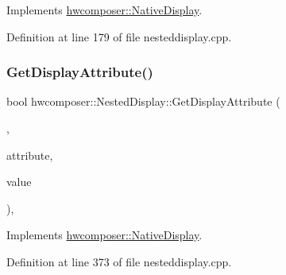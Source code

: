 Implements \mbox{\hyperlink{classhwcomposer_1_1NativeDisplay_a9d4d9d2f6633fe37025210cac6e8cc6c}{hwcomposer\+::\+Native\+Display}}.



Definition at line 179 of file nesteddisplay.\+cpp.


\begin{DoxyCode}{0}
\end{DoxyCode}
\mbox{\label{classhwcomposer_1_1NestedDisplay_aa63c8ca48c295a453afe8d9bec3d8561}} 
\subsubsection{\texorpdfstring{Get\+Display\+Attribute()}{GetDisplayAttribute()}}
{\footnotesize\ttfamily bool hwcomposer\+::\+Nested\+Display\+::\+Get\+Display\+Attribute (\begin{DoxyParamCaption}\item[{uint32\+\_\+t}]{,  }\item[{H\+W\+C\+Display\+Attribute}]{attribute,  }\item[{int32\+\_\+t $\ast$}]{value }\end{DoxyParamCaption})\hspace{0.3cm}{\ttfamily [override]}, {\ttfamily [virtual]}}



Implements \mbox{\hyperlink{classhwcomposer_1_1NativeDisplay_aeb880e4a295eab49a98804380c2dcb84}{hwcomposer\+::\+Native\+Display}}.



Definition at line 373 of file nesteddisplay.\+cpp.


